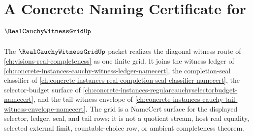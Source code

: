 \chapter{A Concrete Naming Certificate for $\RealCauchyWitnessGridUp$}
\label{ch:concrete-instances-real-cauchy-witness-grid-namecert}

The $\RealCauchyWitnessGridUp$ packet realizes the diagonal witness route of \autoref{ch:visions-real-completeness} as one finite grid. It joins the witness ledger of \autoref{ch:concrete-instances-cauchy-witness-ledger-namecert}, the completion-seal classifier of \autoref{ch:concrete-instances-real-completion-seal-classifier-namecert}, the selector-budget surface of \autoref{ch:concrete-instances-regularcauchyselectorbudget-namecert}, and the tail-witness envelope of \autoref{ch:concrete-instances-cauchy-tail-witness-envelope-namecert}. The grid is a NameCert surface for the displayed selector, ledger, seal, and tail rows; it is not a quotient stream, host real equality, selected external limit, countable-choice row, or ambient completeness theorem.

